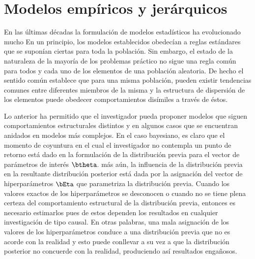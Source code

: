\documentclass[10pt,openright]{book}\usepackage[]{graphicx}\usepackage[]{color}
\begin{document}
 
\chapter{Modelos emp\'iricos y jer\'arquicos}

En las \'ultimas d\'ecadas la formulaci\'on de modelos estad\'isticos ha evolucionado mucho En un principio, los modelos establecidos obedec\'ian a reglas est\'andares que se supon\'ian ciertas para toda la poblaci\'on. Sin embargo, el estado de la naturaleza de la mayor\'ia de los problemas pr\'actico no sigue una regla com\'un para todos y cada uno de los elementos de una poblaci\'on aleatoria. De hecho el sentido com\'un establece que para una misma poblaci\'on, pueden existir tendencias comunes entre diferentes miembros de la misma y la estructura de dispersi\'on de los elementos puede obedecer comportamientos dis\'imiles a trav\'es de \'estos.

Lo anterior ha permitido que el investigador pueda proponer modelos que siguen comportamientos estructurales distintos y en algunos casos que se encuentran anidados en modelos m\'as complejos. En el caso bayesiano, es claro que el momento de coyuntura en el cual el investigador no contempla un punto de retorno est\'a dado en la formulaci\'on de la distribuci\'on previa para el vector de par\'ametros de inter\'es $\btheta$. m\'as a\'un, la influencia de la distribuci\'on previa en la resultante distribuci\'on posterior est\'a dada por la asignaci\'on del vector de hiperpar\'ametros $\bEta$ que parametriza la distribuci\'on previa. Cuando los valores exactos de los hiperpar\'ametros se desconocen o cuando no se tiene plena certeza del comportamiento estructural de la distribuci\'on previa, entonces es necesario estimarlos pues de estos dependen los resultados en cualquier investigaci\'on de tipo causal. En otras palabras, una mala asignaci\'on de los valores de los hiperpar\'ametros conduce a una distribuci\'on previa que no es acorde con la realidad y esto puede conllevar a su vez a que la distribuci\'on posterior no concuerde con la realidad, produciendo as\'i resultados enga\~nosos.
\end{document}
